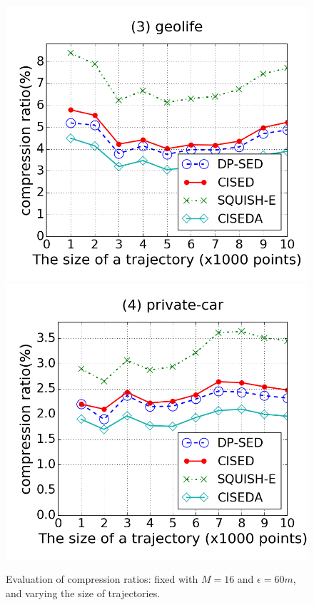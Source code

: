 \begin{figure}[tb!]
\includegraphics[scale = 0.250]{figures/Exp-CR-size-geolife.png}
\includegraphics[scale = 0.250]{figures/Exp-CR-size-private.png}
\vspace{-2ex}
\caption{\small Evaluation of compression ratios: fixed with $M=16$ and $\epsilon=60m$, and varying the size of trajectories.}
\label{fig:cr-size}
\vspace{-2ex}
\end{figure}



